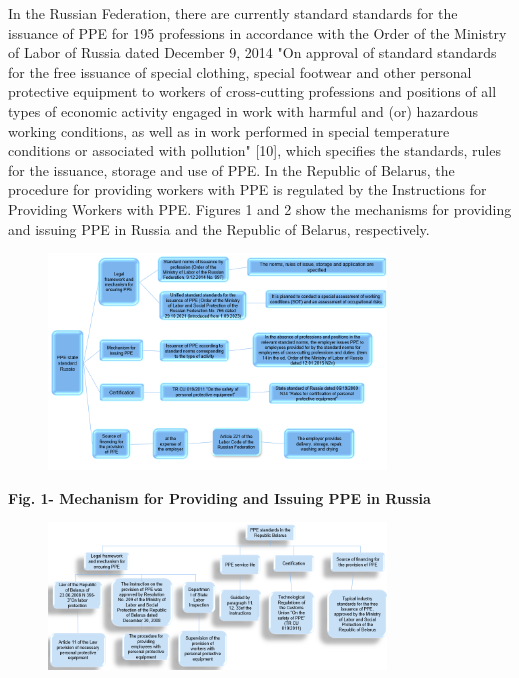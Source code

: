 {In the Russian Federation, there are currently standard standards for
the issuance of PPE for 195 professions in accordance with the Order of
the Ministry of Labor of Russia dated December 9, 2014 "On approval of
standard standards for the free issuance of special clothing, special
footwear and other personal protective equipment to workers of
cross-cutting professions and positions of all types of economic
activity engaged in work with harmful and (or) hazardous working
conditions, as well as in work performed in special temperature
conditions or associated with pollution" {[}10{]}, which specifies the
standards, rules for the issuance, storage and use of PPE. In the
Republic of Belarus, the procedure for providing workers with PPE is
regulated by the Instructions for Providing Workers with PPE. Figures 1
and 2 show the mechanisms for providing and issuing PPE in Russia and
the Republic of Belarus, respectively.

\begin{figure}[H]
	\centering
	\includegraphics[width=0.8\textwidth]{media/chem2/image2}
	\caption*{}
\end{figure}


{\bfseries Fig. 1- Mechanism for Providing and Issuing PPE in Russia}

\begin{figure}[H]
	\centering
	\includegraphics[width=0.8\textwidth]{media/chem2/image3}
	\caption*{}
\end{figure}


}
